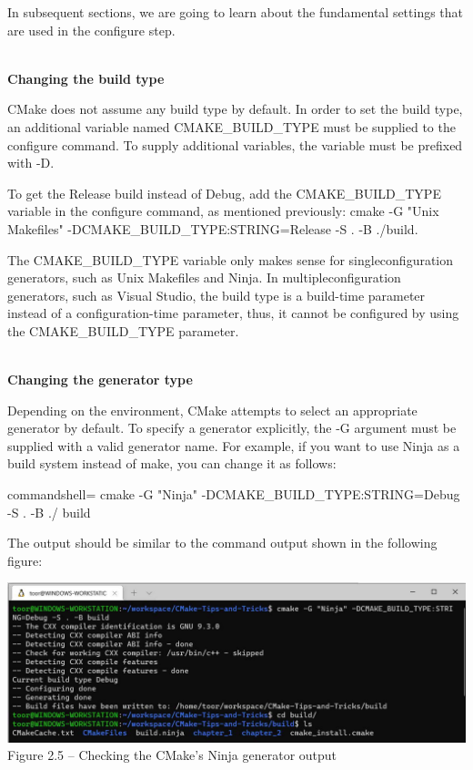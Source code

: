 In subsequent sections, we are going to learn about the fundamental settings that are used in the configure step.

\hspace*{\fill} \\ %
\noindent
\textbf{Changing the build type}

CMake does not assume any build type by default. In order to set the build type, an additional variable named CMAKE\_BUILD\_TYPE must be supplied to the configure command. To supply additional variables, the variable must be prefixed with -D.

To get the Release build instead of Debug, add the CMAKE\_BUILD\_TYPE variable in the configure command, as mentioned previously: cmake -G "Unix Makefiles" -DCMAKE\_BUILD\_TYPE:STRING=Release -S . -B ./build.

\begin{tcolorbox}[colback=webgreen!5!white,colframe=webgreen!75!black,title=Note]
The CMAKE\_BUILD\_TYPE variable only makes sense for singleconfiguration generators, such as Unix Makefiles and Ninja. In multipleconfiguration generators, such as Visual Studio, the build type is a build-time parameter instead of a configuration-time parameter, thus, it cannot be configured by using the CMAKE\_BUILD\_TYPE parameter.
\end{tcolorbox}

\hspace*{\fill} \\ %
\noindent
\textbf{Changing the generator type}

Depending on the environment, CMake attempts to select an appropriate generator by default. To specify a generator explicitly, the -G argument must be supplied with a valid generator name. For example, if you want to use Ninja as a build system instead of make, you can change it as follows:

\begin{tcblisting}{commandshell={}}
cmake -G "Ninja" -DCMAKE_BUILD_TYPE:STRING=Debug -S . -B ./
build
\end{tcblisting}

The output should be similar to the command output shown in the following figure:

\begin{center}
\includegraphics[width=1.\textwidth]{content/1/chapter2/images/5.jpg}\\
Figure 2.5 – Checking the CMake's Ninja generator output
\end{center}

